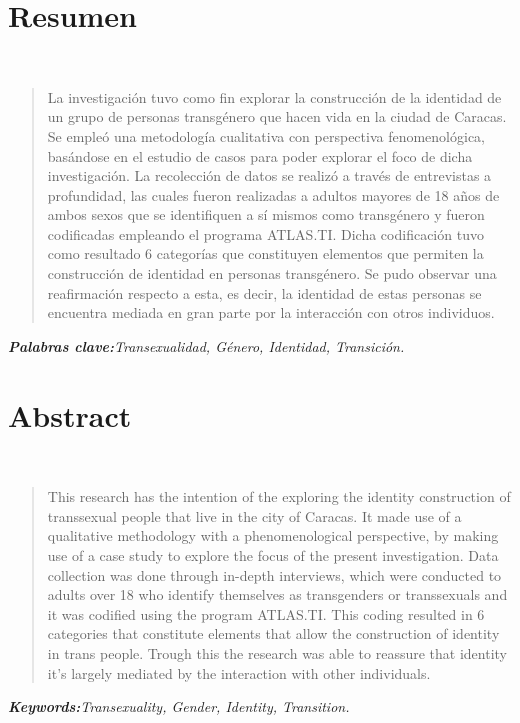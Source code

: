 
\chapter{Resumen}
\begin{center}
	\large\scshape\thetitle\
\end{center}

\begin{quote}
La investigación tuvo como fin explorar la construcción de la identidad
de un grupo de personas transgénero que hacen vida en la ciudad de Caracas.
Se empleó una metodología cualitativa con perspectiva fenomenológica, basándose
en el estudio de casos para poder explorar el foco de dicha investigación.
La recolección de datos se realizó a través de entrevistas a profundidad, las
cuales fueron realizadas a adultos mayores de 18 años de ambos sexos que se
identifiquen a sí mismos como transgénero y fueron codificadas empleando el
programa ATLAS.TI\@.
Dicha codificación tuvo como resultado 6 categorías que constituyen elementos
que permiten la construcción de identidad en personas transgénero.
Se pudo observar una reafirmación respecto a esta, es decir, la identidad de
estas personas se encuentra mediada en gran parte por la interacción con otros
individuos.
\end{quote}

\itshape\textbf{Palabras clave:}\normalfont{}Transexualidad, Género, Identidad,
Transición.

\chapter{Abstract}

\begin{center}
	\large\scshape\theengtitle\
\end{center}

\begin{quote}
This research has the intention of the exploring the identity construction of
transsexual people that live in the city of Caracas.
It made use of a qualitative methodology with a phenomenological perspective, by
making use of a case study to explore the focus of the present investigation.
Data collection was done through in-depth interviews, which were conducted to
adults over 18 who identify themselves as transgenders or transsexuals and it
was codified using the program ATLAS.TI\@.
This coding resulted in 6 categories that constitute elements that allow the
construction of identity in trans people.
Trough this the research was able to reassure that identity it's largely
mediated by the interaction with other individuals.

\end{quote}

\itshape\textbf{Keywords:}\normalfont{}Transexuality, Gender, Identity,
Transition.

\cleardoublepage\
